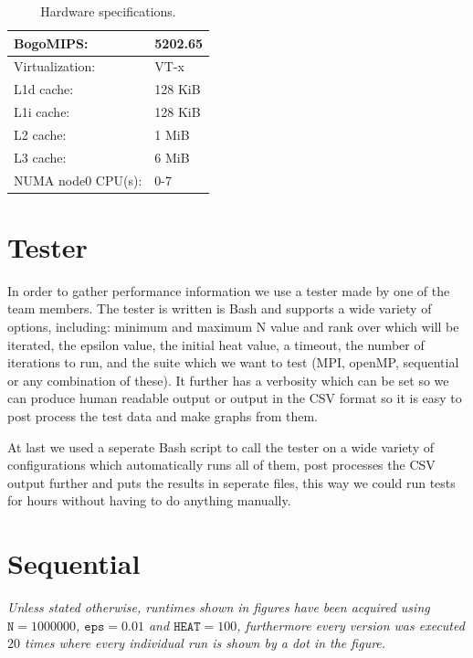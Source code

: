 \documentclass[a4paper]{article}
\begin{document}
\begin{table}[h]
\begin{tabular}{|l|l|}
        BogoMIPS:            &    5202.65\\\hline
        Virtualization:      &    VT-x\\\hline
        L1d cache:           &    128 KiB\\\hline
        L1i cache:           &    128 KiB\\\hline
        L2 cache:            &    1 MiB\\\hline
        L3 cache:            &    6 MiB\\\hline
        NUMA node0 CPU(s):   &    0-7\\
        \hline
    \end{tabular}
    \caption{Hardware specifications.}
    \label{tab: hardware}
\end{table}

\section{Tester}
In order to gather performance information we use a tester made by one of the team members. The tester is written is Bash and supports a wide variety of options, including: minimum and maximum N value and rank over which will be iterated, the epsilon value, the initial heat value, a timeout, the number of iterations to run, and the suite which we want to test (MPI, openMP, sequential or any combination of these). It further has a verbosity which can be set so we can produce human readable output or output in the CSV format so it is easy to post process the test data and make graphs from them.

At last we used a seperate Bash script to call the tester on a wide variety of configurations which automatically runs all of them, post processes the CSV output further and puts the results in seperate files, this way we could run tests for hours without having to do anything manually.

    
\section{Sequential}
\textit{Unless stated otherwise, runtimes shown in figures have been acquired using $\texttt{N} = 1000000$, $\texttt{eps} = 0.01$ and $\texttt{HEAT} = 100$, furthermore every version was executed $20$ times where every individual run is shown by a dot in the figure.}\\
\end{document}
